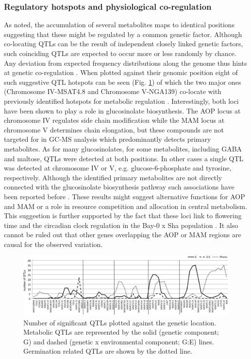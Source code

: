 \subsubsection{Regulatory hotspots and physiological co-regulation}
As noted, the accumulation of several metabolites maps to identical positions suggesting that these might 
be regulated by a common genetic factor. Although co-locating QTLs can be the result of independent closely 
linked genetic factors, such coinciding QTLs are expected to occur more or less randomly by chance. Any 
deviation from expected frequency distributions along the genome thus hints at genetic co-regulation 
\cite{Breitling:2008a}. When plotted against their genomic position eight of such suggestive QTL hotspots 
can be seen (Fig. \ref{fig:nQTL}) of which the two major ones (Chromosome IV-MSAT4.8 and Chromosome V-NGA139) co-locate 
with previously identified hotspots for metabolic regulation \cite{Kliebenstein:2001, Keurentjes:2006, 
Wentzell:2007, Rowe:2008}.  Interestingly, both loci have been shown to play a role in glucosinolate 
biosynthesis. The AOP locus at chromosome IV regulates side chain modification while the 
MAM locus at chromosome V determines chain elongation, but these compounds are not targeted for in GC-MS 
analysis which predominantly detects primary metabolites. As for many glucosinolates, for some metabolites, 
including GABA and maltose, QTLs were detected at both positions. In other cases a single QTL was detected 
at chromosome IV or V, e.g. glucose-6-phosphate and tyrosine, respectively. Although the identified  primary 
metabolites are not directly connected with the glucosinolate biosynthesis pathway such associations have 
been reported before \cite{Rowe:2008}. These results might suggest alternative functions for AOP and MAM 
or a role in resource competition and allocation in central metabolism. This suggestion is further supported 
by the fact that these loci link to flowering time and the circadian clock regulation in the Bay-0 x Sha 
population \cite{Chan:2011}. It also cannot be ruled out that other genes overlapping the AOP or MAM 
regions are causal for the observed variation.

\begin{figure}[!ht]
  \centering
  \includegraphics[keepaspectratio,scale=0.30]{eps/image_3_2_5.eps}
  \caption[Number of significant QTL]{Number of significant QTLs plotted against the genetic location. Metabolic 
          QTLs are represented by the solid (genetic component; G) and dashed (genetic x environmental component; 
          G:E) lines. Germination related QTLs \cite{Joosen:2011} are shown by the dotted line.}
          \label{fig:nQTL}
\end{figure}

